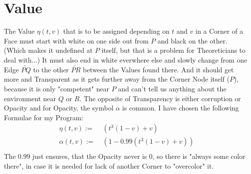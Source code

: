 \section{Value}
    The Value $\eta(t, v)$ that is to be assigned depending on $t$ and $v$ in a Corner of a Face must start with white on one side out from $P$ and black on the other. (Which makes it undefined at $P$ itself, but that is a problem for Theoreticians to deal with...) It must also end in white everwhere else and slowly change from one Edge $\widetilde{PQ}$ to the other $\widetilde{PR}$ between the Values found there. And it should get more and Transparent as it gets further away from the Corner Node itself ($P$), because it is only "competent" near $P$ and can't tell us anything about the environment near $Q$ or $R$. The opposite of Transparency is either corruption or Opacity and for Opacity, the symbol $\alpha$ is common. I have chosen the following Formulae for my Program:
    $$\begin{aligned}
        \eta(t, v)   :=&\phantom{.}          (t^3(1 - v) + v) \\
        \alpha(t, v) :=&\phantom{.} (1 - 0.99(t^3(1 - v) + v)) \\
    \end{aligned}$$
    The 0.99 just ensures, that the Opacity never is 0, so there is "always some color there", in case it is needed for lack of another Corner to "overcolor" it.

